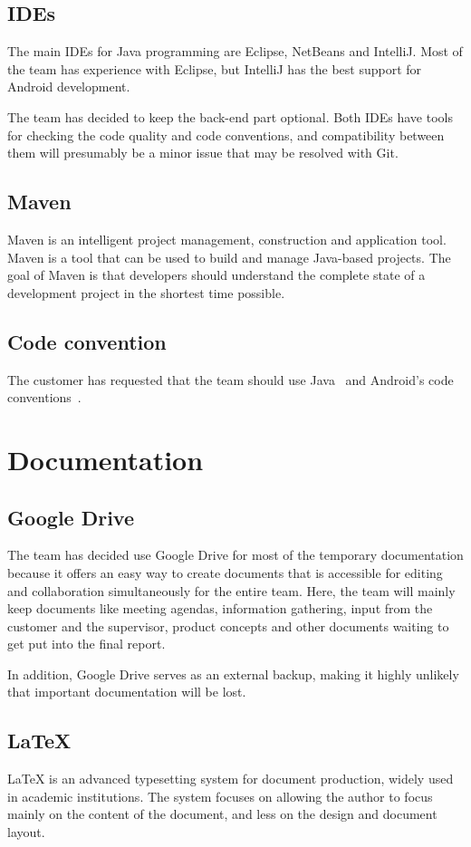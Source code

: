 \subsection{IDEs}
The main IDEs for Java programming are Eclipse, NetBeans and IntelliJ. Most of the team has experience with Eclipse, but IntelliJ has the best support for Android development.

The team has decided to keep the back-end part optional. Both IDEs have tools for checking the code quality and code conventions, and compatibility between them will presumably be a minor issue that may be resolved with Git.

\subsection{Maven}
Maven is an intelligent project management, construction and application tool. Maven is a tool that can be used to build and manage Java-based projects. The goal of Maven is that developers should understand the complete state of a development project in the shortest time possible.

\subsection{Code convention}
The customer has requested that the team should use Java~\cite{javaconv} and Android's code conventions~\cite{androidconv}.

\section{Documentation}

\subsection{Google Drive}
The team has decided use Google Drive for most of the temporary documentation because it offers an easy way to create documents that is accessible for editing and collaboration simultaneously for the entire team. Here, the team will mainly 
keep documents like meeting agendas, information gathering, input from the customer and the supervisor, product concepts and other documents waiting to get put into the final report. 

In addition, Google Drive serves as an external backup, making it highly unlikely that important documentation will be lost. 


\subsection{\LaTeX}
LaTeX is an advanced typesetting system for document production, widely used in
academic institutions. The system focuses on allowing the author to focus mainly on the content of the document, and less on the design and document layout.

